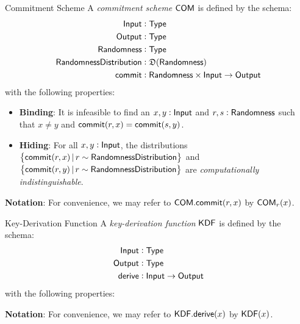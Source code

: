 \begin{definitiontoc}{Commitment Scheme}
    A \emph{commitment scheme} ${\textsf{COM}}$ is defined by the schema:
    \begin{align*}
        {\textsf{Input}}                  &: {\textsf{Type}} \\
        {\textsf{Output}}                 &: {\textsf{Type}} \\
        {\textsf{Randomness}}             &: {\textsf{Type}} \\
        {\textsf{RandomnessDistribution}} &: \mathfrak{D}({\textsf{Randomness}}) \\
        {\textsf{commit}}                 &: {\textsf{Randomness}} \times {\textsf{Input}} \to {\textsf{Output}}
    \end{align*}
    with the following properties:
    \begin{itemize}
        \item \textbf{Binding}: It is infeasible to find an $x, y : {\textsf{Input}}$ and $r, s: {\textsf{Randomness}}$ such that $x \ne y$ and ${\textsf{commit}}(r,x) = {\textsf{commit}}(s,y)$.
        \item \textbf{Hiding}: For all $x, y : {\textsf{Input}}$, the distributions $\set{{\textsf{commit}}(r,x) \,|\, r \sim {\textsf{RandomnessDistribution}}}$ and \\ $\set{{\textsf{commit}}(r,y) \,|\, r \sim {\textsf{RandomnessDistribution}}}$ are \emph{computationally indistinguishable}.
    \end{itemize}

    \textbf{Notation}: For convenience, we may refer to ${\textsf{COM}}.{\textsf{commit}}(r,x)$ by ${\textsf{COM}}_r(x)$.
\end{definitiontoc}

\begin{definitiontoc}{Key-Derivation Function}
    A \emph{key-derivation function} ${\textsf{KDF}}$ is defined by the schema:
    \begin{align*}
        {\textsf{Input}}  &: {\textsf{Type}} \\
        {\textsf{Output}} &: {\textsf{Type}} \\
        {\textsf{derive}} &: {\textsf{Input}} \to {\textsf{Output}}
    \end{align*}
    with the following properties:

    \textbf{Notation}: For convenience, we may refer to ${\textsf{KDF}}.{\textsf{derive}}(x)$ by ${\textsf{KDF}}(x)$.
\end{definitiontoc}

